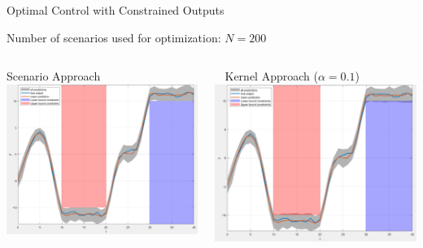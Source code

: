 \documentclass[student, noshadow, lsr, english, aspectratio=169]{ITR_LSR_slides}
\begin{document}
\begin{frame}{Optimal Control with Constrained Outputs}

Number of scenarios used for optimization: $N = 200$
\vspace{.3cm}
\begin{columns}[onlytextwidth, T]
		\begin{column}{.5\textwidth}
			\;\; Scenario Approach
			\includegraphics[width= .9\textwidth]{Scenario_plot}
		\end{column}
		\begin{column}{.5\textwidth}
			$\;\;$ Kernel Approach  ($\alpha = 0.1$)
			\includegraphics[width=.9\textwidth]{Kernel_plot}
		\end{column}
	\end{columns}\vspace{.5cm}
\end{frame}	
\end{document}
